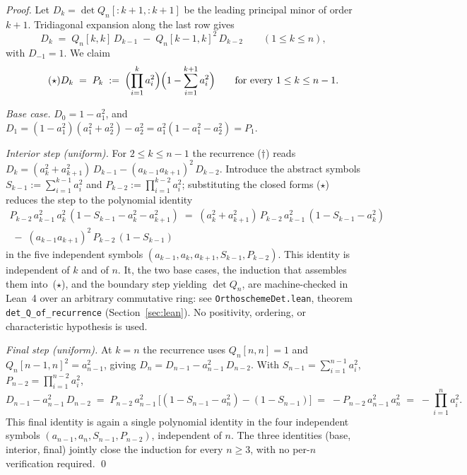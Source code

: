\documentclass[11pt,a4paper]{article}
\theoremstyle{remark}
\theoremstyle{plain}
\begin{document}
\begin{proof}
Let $D_k = \det Q_n[:k{+}1,:k{+}1]$ be the leading principal minor
of order $k+1$.  Tridiagonal expansion along the last row gives
\begin{equation}\tag{$\dagger$}
D_k \;=\; Q_n[k,k]\, D_{k-1} \;-\; Q_n[k-1,k]^2\, D_{k-2}
\qquad (1 \le k \le n),
\end{equation}
with $D_{-1} = 1$.  We claim
\begin{equation}\tag{$\star$}
D_k \;=\; P_k \;:=\;
\Bigl(\prod_{i=1}^k a_i^2\Bigr)\Bigl(1 - \sum_{i=1}^{k+1} a_i^2\Bigr)
\qquad \text{for every } 1 \le k \le n-1.
\end{equation}

\emph{Base case.}  $D_0 = 1 - a_1^2$, and
$D_1 = (1 - a_1^2)(a_1^2 + a_2^2) - a_2^2
     = a_1^2(1 - a_1^2 - a_2^2) = P_1$.

\emph{Interior step (uniform).}  For $2 \le k \le n-1$ the
recurrence ($\dagger$) reads
$D_k = (a_k^2 + a_{k+1}^2)\, D_{k-1} - (a_{k-1} a_{k+1})^2\, D_{k-2}$.
Introduce the abstract symbols
$S_{k-1} := \sum_{i=1}^{k-1} a_i^2$ and
$P_{k-2} := \prod_{i=1}^{k-2} a_i^2$; substituting the closed forms
($\star$) reduces the step to the polynomial identity
\begin{multline*}
P_{k-2}\, a_{k-1}^2\, a_k^2\, (1 - S_{k-1} - a_k^2 - a_{k+1}^2)
\;=\;
(a_k^2 + a_{k+1}^2)\, P_{k-2}\, a_{k-1}^2\, (1 - S_{k-1} - a_k^2) \\
\;-\;
(a_{k-1} a_{k+1})^2\, P_{k-2}\, (1 - S_{k-1})
\end{multline*}
in the five independent symbols $(a_{k-1}, a_k, a_{k+1}, S_{k-1},
P_{k-2})$.  This identity is independent of $k$ and of $n$.  It, the two
base cases, the induction that assembles them into~($\star$), and the
boundary step yielding $\det Q_n$, are machine-checked in Lean~4 over an
arbitrary commutative ring: see \texttt{OrthoschemeDet.lean}, theorem
\texttt{det\_Q\_of\_recurrence} (Section~\ref{sec:lean}).  No positivity,
ordering, or characteristic hypothesis is used.

\emph{Final step (uniform).}  At $k = n$ the recurrence uses
$Q_n[n,n] = 1$ and $Q_n[n-1,n]^2 = a_{n-1}^2$, giving
$D_n = D_{n-1} - a_{n-1}^2\, D_{n-2}$.  With
$S_{n-1} = \sum_{i=1}^{n-1} a_i^2$, $P_{n-2} = \prod_{i=1}^{n-2} a_i^2$,
\[
D_{n-1} - a_{n-1}^2\, D_{n-2}
\;=\; P_{n-2}\, a_{n-1}^2\, \bigl[(1 - S_{n-1} - a_n^2) - (1 - S_{n-1})\bigr]
\;=\; -P_{n-2}\, a_{n-1}^2\, a_n^2
\;=\; -\prod_{i=1}^n a_i^2.
\]
This final identity is again a single polynomial identity in the four
independent symbols $(a_{n-1}, a_n, S_{n-1}, P_{n-2})$, independent of
$n$.  The three identities (base, interior, final) jointly close the
induction for every $n \ge 3$, with no per-$n$ verification required.
\qed
\end{proof}
\end{document}
